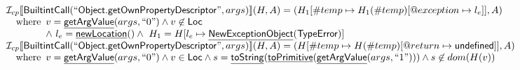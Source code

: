 \documentclass{article}
\makeatletter
\newcommand{\SF}[1]{\mbox{\textsf{#1}}}
\newcommand{\wherec}[1]{{\rm where}\begin{array}[t]{l}#1\end{array}}
\newcommand{\Loc}{\SF{Loc}}
\newcommand{\I}{\mathcal{I}}
\newcommand{\lbr}{\llbracket}
\newcommand{\rbr}{\rrbracket}
\newcommand{\hf}[1]{\underline{\sf #1}}
\newcommand{\varloc}[1]{\##1}
\newcommand{\varprop}[1]{@#1}
\makeatother
\begin{document}
\[
\begin{array}{l}

\I _{cp}\lbr \SF{BuiltintCall}(``\SF{Object.getOwnPropertyDescriptor}",args)\rbr(H,A)
 = (H_1[\varloc{temp}\mapsto H_1(\varloc{temp})[\varprop{exception}\mapsto l_{e}]], A) \\
\quad\wherec{
  v = \hf{getArgValue}(args, ``0") \land v\not\in\Loc\\
  \land\ l_e = \hf{newLocation}() \land\ H_1=H[l_e\mapsto\hf{NewExceptionObject}(\SF{TypeError})] }\\

\I _{cp}\lbr \SF{BuiltintCall}(``\SF{Object.getOwnPropertyDescriptor}",args)\rbr(H,A)
 = (H[\#temp \mapsto H(\#temp)[@return \mapsto \SF{undefined}]], A)\\
  \quad\wherec{v = \hf{getArgValue}(args, ``0") \land v \in\Loc
  \land s = \hf{toString}(\hf{toPrimitive}(\hf{getArgValue}(args,``1"))) \land s \not\in dom(H(v))}\\


\end{array}\]
\end{document}
